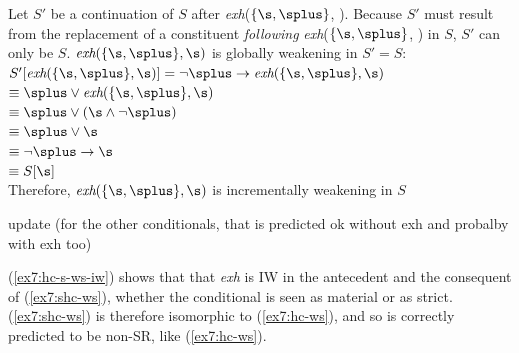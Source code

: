 \begin{exe}
{		Let $S'$ be a continuation of $S$ after \textit{exh}($\lbrace\s, \splus\rbrace$, \s). Because $S'$ must result from the replacement of a constituent \textit{following} \textit{exh}($\lbrace\s, \splus\rbrace$, \s) in $S$, $S'$ can only be $S$. $\textit{exh}(\lbrace\s, \splus\rbrace, \s)$ is globally weakening in $S'=S$:\\
		$S'[\textit{exh}(\lbrace\s, \splus\rbrace, \s)] = \neg\splus \rightarrow \textit{exh}(\lbrace\s, \splus\rbrace, \s)$\\
		$\equiv \splus \vee \textit{exh}(\lbrace\s, \splus\rbrace, \s)$\\
		 $\equiv \splus \vee (\s\wedge\neg\splus)$\\
		 $\equiv \splus \vee\s$\\
		 $\equiv \neg\splus \rightarrow\s$\\
		 $\equiv S[\s]$\\
		Therefore, $\textit{exh}(\lbrace\s, \splus\rbrace, \s)$ is incrementally weakening in $S$}\label{ex7:iw-hc-sw-cons-m}
\end{exe}

update (for the other conditionals, that is predicted ok without exh and probalby with exh too)

(\ref{ex7:hc-s-ws-iw}) shows that that \textit{exh} is IW in the antecedent and the consequent of (\ref{ex7:shc-ws}), whether the conditional is seen as material or as strict. (\ref{ex7:shc-ws}) is therefore isomorphic to (\ref{ex7:hc-ws}), and so is correctly predicted to be non-SR, like (\ref{ex7:hc-ws}).

